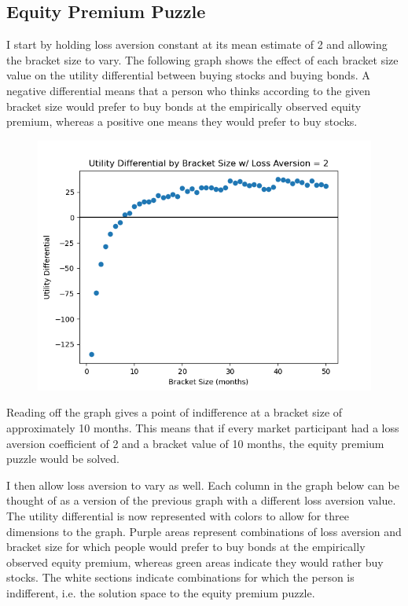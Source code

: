 \documentclass[10pt,twocolumn]{article}
\begin{document}
\subsection{Equity Premium Puzzle}
I start by holding loss aversion constant at its mean estimate of 2 and allowing the bracket size to vary. The following graph shows the effect of each bracket size value on the utility differential between buying stocks and buying bonds. A negative differential means that a person who thinks according to the given bracket size would prefer to buy bonds at the empirically observed equity premium, whereas a positive one means they would prefer to buy stocks. 
\begin{figure}[H]
    \centering
    \includegraphics[width=0.8\linewidth]{images/EPP1.png}
    \label{fig:enter-label}
\end{figure}

Reading off the graph gives a point of indifference at a bracket size of approximately 10 months. This means that if every market participant had a loss aversion coefficient of 2 and a bracket value of 10 months, the equity premium puzzle would be solved.

I then allow loss aversion to vary as well. Each column in the graph below can be thought of as a version of the previous graph with a different loss aversion value. The utility differential is now represented with colors to allow for three dimensions to the graph. Purple areas represent combinations of loss aversion and bracket size for which people would prefer to buy bonds at the empirically observed equity premium, whereas green areas indicate they would rather buy stocks. The white sections indicate combinations for which the person is indifferent, i.e. the solution space to the equity premium puzzle.
\end{document}
